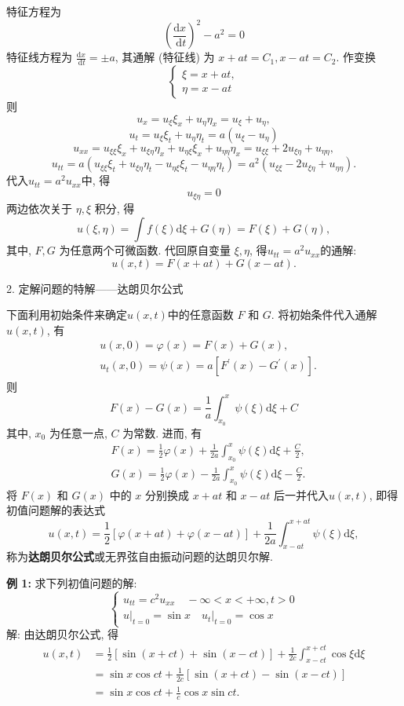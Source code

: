 特征方程为
$$
\left(\frac{\mathrm{d} x}{\mathrm{~d} t}\right)^{2}-a^{2}=0
$$
特征线方程为 $ \frac{\mathrm{d} x}{\mathrm{~d} t}= \pm a $, 其通解 (特征线) 为 $ x+a t=C_{1}, x-a t=C_{2} $. 作变换
$$
\left\{\begin{array}{l}
\xi=x+a t, \\
\eta=x-a t
\end{array}\right.
$$
则
$$
u_{x}=u_{\xi} \xi_{x}+u_{\eta} \eta_{x}=u_{\xi}+u_{\eta},
$$
$$
u_{t}=u_{\xi} \xi_{t}+u_{\eta} \eta_{t}=a\left(u_{\xi}-u_{\eta}\right) $$
$$u_{x x}=u_{\xi \xi} \xi_{x}+u_{\xi \eta} \eta_{x}+u_{\eta \xi} \xi_{x}+u_{\eta \eta} \eta_{x}=u_{\xi \xi}+2 u_{\xi \eta}+u_{\eta \eta}, $$
$$u_{t t}=a\left(u_{\xi \xi} \xi_{t}+u_{\xi \eta} \eta_{t}-u_{\eta \xi} \xi_{t}-u_{\eta \eta} \eta_{t}\right)=a^{2}\left(u_{\xi \xi}-2 u_{\xi \eta}+u_{\eta \eta}\right) .
$$
代入$u_{t t}=a^{2} u_{x x}$中, 得
$$
u_{\xi \eta}=0
$$
两边依次关于 $ \eta, \xi $ 积分, 得
$$
u(\xi, \eta)=\int f(\xi) \mathrm{d} \xi+G(\eta)=F(\xi)+G(\eta),
$$
其中, $ F, G $ 为任意两个可微函数. 代回原自变量 $ \xi, \eta $, 得$u_{t t}=a^{2} u_{x x}$的通解:
$$
u(x, t)=F(x+a t)+G(x-a t) .
$$

2. 定解问题的特解——达朗贝尔公式

下面利用初始条件来确定$u(x,t)$中的任意函数 $ F $ 和 $ G $. 将初始条件代入通解$u(x,t)$, 有
$$
\begin{aligned}
&u(x, 0)=\varphi(x)=F(x)+G(x), \\
&u_{t}(x, 0)=\psi(x)=a\left[F^{\prime}(x)-G^{\prime}(x)\right] .
\end{aligned}
$$
则
$$
F(x)-G(x)=\frac{1}{a} \int_{x_{0}}^{x} \psi(\xi) \mathrm{d} \xi+C
$$
其中, $ x_{0} $ 为任意一点, $ C $ 为常数. 进而, 有
$$
\begin{aligned}
&F(x)=\frac{1}{2} \varphi(x)+\frac{1}{2 a} \int_{x_{0}}^{x} \psi(\xi) \mathrm{d} \xi+\frac{C}{2}, \\
&G(x)=\frac{1}{2} \varphi(x)-\frac{1}{2 a} \int_{x_{0}}^{x} \psi(\xi) \mathrm{d} \xi-\frac{C}{2} .
\end{aligned}
$$
将 $ F(x) $ 和 $ G(x) $ 中的 $ x $ 分别换成 $ x+a t $ 和 $ x-a t $ 后一并代入$u(x,t)$, 即得初值问题解的表达式
$$
u(x, t)=\frac{1}{2}[\varphi(x+a t)+\varphi(x-a t)]+\frac{1}{2 a} \int_{x-a t}^{x+a t} \psi(\xi) \mathrm{d} \xi,
$$
称为\textbf{达朗贝尔公式}或无界弦自由振动问题的达朗贝尔解.

\textbf{例 1: }求下列初值问题的解:
$$
\left\{\begin{array}{l}
u_{t t}=c^{2} u_{x x} \quad-\infty<x<+\infty, t>0 \\
\left.u\right|_{t=0}=\left.\sin x \quad u_{t}\right|_{t=0}=\cos x
\end{array}\right.
$$
解: 由达朗贝尔公式, 得
$$
\begin{aligned}
u(x, t) & =\frac{1}{2}[\sin (x+c t)+\sin (x-c t)]+\frac{1}{2 c} \int_{x-c t}^{x+c t} \cos \xi \mathrm{d} \xi \\
& =\sin x \cos c t+\frac{1}{2 c}[\sin (x+c t)-\sin (x-c t)] \\
& =\sin x \cos c t+\frac{1}{c} \cos x \sin c t .
\end{aligned}
$$

